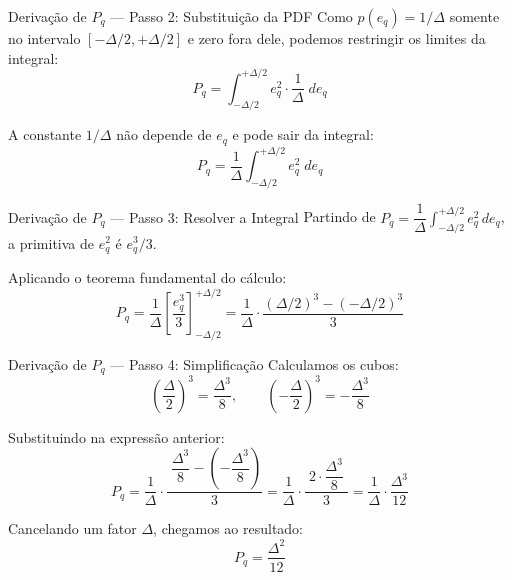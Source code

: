 
\begin{frame}{Derivação de $P_q$ — Passo 2: Substituição da PDF}
  Como $p(e_q) = 1/\Delta$ somente no intervalo
  $[-\Delta/2, +\Delta/2]$ e zero fora dele,
  podemos restringir os limites da integral:
  \[
    P_q = \int_{-\Delta/2}^{+\Delta/2} e_q^2 \cdot \frac{1}{\Delta} \; de_q
  \]

  \vspace{0.6cm}
  A constante $1/\Delta$ não depende de $e_q$ e pode sair da integral:
  \[
    P_q = \frac{1}{\Delta}
          \int_{-\Delta/2}^{+\Delta/2} e_q^2 \; de_q
  \]
\end{frame}


\begin{frame}{Derivação de $P_q$ — Passo 3: Resolver a Integral}
  Partindo de
  $P_q = \dfrac{1}{\Delta}\displaystyle\int_{-\Delta/2}^{+\Delta/2} e_q^2 \, de_q$,
  a primitiva de $e_q^2$ é $e_q^3/3$.

  \vspace{0.5cm}
  Aplicando o teorema fundamental do cálculo:
  \[
    P_q = \frac{1}{\Delta}
          \left[\frac{e_q^3}{3}\right]_{-\Delta/2}^{+\Delta/2}
        = \frac{1}{\Delta}
          \cdot\frac{\left(\Delta/2\right)^3 - \left(-\Delta/2\right)^3}{3}
  \]
\end{frame}


\begin{frame}{Derivação de $P_q$ — Passo 4: Simplificação}
  Calculamos os cubos:
  \[
    \left(\frac{\Delta}{2}\right)^{\!3} = \frac{\Delta^3}{8},
    \qquad
    \left(-\frac{\Delta}{2}\right)^{\!3} = -\frac{\Delta^3}{8}
  \]

  \vspace{0.3cm}
  Substituindo na expressão anterior:
  \[
    P_q = \frac{1}{\Delta}
          \cdot\frac{\;\dfrac{\Delta^3}{8} -
                     \left(-\dfrac{\Delta^3}{8}\right)}{3}
        = \frac{1}{\Delta}
          \cdot\frac{\;2\cdot\dfrac{\Delta^3}{8}\;}{3}
        = \frac{1}{\Delta}\cdot\frac{\Delta^3}{12}
  \]

  \vspace{0.3cm}
  Cancelando um fator $\Delta$, chegamos ao resultado:
  \[
    \boxed{\,P_q = \frac{\Delta^2}{12}\,}
  \]
\end{frame}

